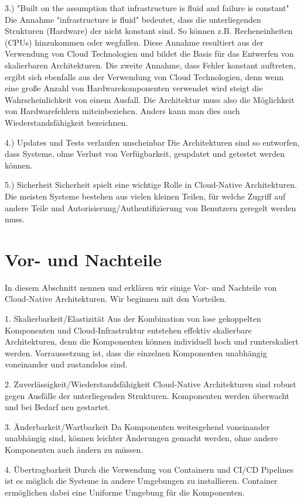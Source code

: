 3.) "Built on the assumption that infrastructure is fluid and failure is constant"
Die Annahme "infrastructure is fluid" bedeutet, dass die unterliegenden Strukturen (Hardware) der nicht konstant sind. So können z.B. Recheneinheiten (CPUs) hinzukommen oder wegfallen. Diese Annahme resultiert aus der Verwendung von Cloud Technologien und bildet die Basis für das Entwerfen von skalierbaren Architekturen.
Die zweite Annahme, dass Fehler konstant auftreten, ergibt sich ebenfalls aus der Verwendung von Cloud Technologien, denn wenn eine große Anzahl von Hardwarekomponenten verwendet wird steigt die Wahrscheinlichkeit von einem Ausfall. Die Architektur muss also die Möglichkeit von Hardwarefehlern miteinbeziehen. Anders kann man dies auch Wiederstandsfähigkeit bezeichnen.

4.) Updates und Tests verlaufen unscheinbar
Die Architekturen sind so entworfen, dass Systeme, ohne Verlust von Verfügbarkeit, geupdatet und getestet werden können.

5.) Sicherheit
Sicherheit spielt eine wichtige Rolle in Cloud-Native Architekturen. Die meisten Systeme bestehen  aus vielen kleinen Teilen, für welche Zugriff auf andere Teile und Autorisierung/Authentifizierung von Benutzern geregelt werden muss.

\section{Vor- und Nachteile}
In diesem Abschnitt nennen und erklären wir einige Vor- und Nachteile von Cloud-Native Architekturen. Wir beginnen mit den Vorteilen.

1. Skalierbarkeit/Elastizität
Aus der Kombination von lose gekoppelten Komponenten und Cloud-Infrastruktur entstehen effektiv skalierbare Architekturen, denn die Komponenten können individuell hoch und runterskaliert werden. Vorraussetzung ist, dass die einzelnen Komponenten unabhängig voneinander und zustandslos sind.

2. Zuverlässigkeit/Wiederstandsfähigkeit
Cloud-Native Architekturen sind robust gegen Ausfälle der unterliegenden Strukturen. Komponenten werden überwacht und bei Bedarf neu gestartet.

3. Änderbarkeit/Wartbarkeit
Da Komponenten weitesgehend voneinander unabhängig sind, können leichter Änderungen gemacht werden, ohne andere Komponenten auch ändern zu müssen.

4. Übertragbarkeit
Durch die Verwendung von Containern und CI/CD Pipelines ist es möglich die Systeme in andere Umgebungen zu installieren. Container ermöglichen dabei eine Uniforme Umgebung für die Komponenten.


